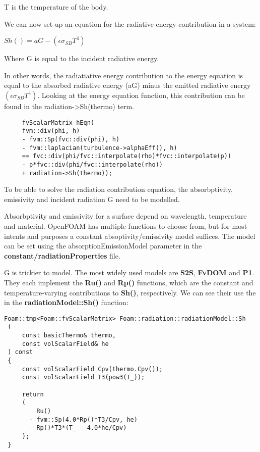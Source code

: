 T is the temperature of the body.

We can now set up an equation for the radiative energy contribution in a system:

$Sh()=aG-(\epsilon \sigma_{SB}T^4)$

Where G is equal to the incident radiative energy.

In other words, the radiatiative energy contribution to the energy equation is equal to the absorbed radiative energy (aG) minus the emitted radiative energy $(\epsilon \sigma_{SB}T^4)$. Looking at the energy equation function, this contribution can be found in the radiation->Sh(thermo) term.

\begin{verbatim}
     fvScalarMatrix hEqn(    
     fvm::div(phi, h)       
     - fvm::Sp(fvc::div(phi), h)
     - fvm::laplacian(turbulence->alphaEff(), h)      
     == fvc::div(phi/fvc::interpolate(rho)*fvc::interpolate(p))
     - p*fvc::div(phi/fvc::interpolate(rho))
     + radiation->Sh(thermo));
\end{verbatim}

To be able to solve the radiation contribution equation, the absorbptivity, emissivity and incident radiation G need to be modelled.

Absorbptivity and emissivity for a surface depend on wavelength, temperature and material. OpenFOAM has multiple functions to choose from, but for most intents and purposes a constant absoptivity/emissivity model suffices. The model can be set using the absorptionEmissionModel parameter in the \textbf{constant/radiationProperties} file.

G is trickier to model. The most widely used models are \textbf{S2S}, \textbf{FvDOM} and \textbf{P1}. They each implement the \textbf{Ru()} and \textbf{Rp()} functions, which are the constant and temperature-varying contributions to \textbf{Sh()}, respectively. We can see their use the in the \textbf{radiationModel::Sh()} function:

\begin{verbatim}
Foam::tmp<Foam::fvScalarMatrix> Foam::radiation::radiationModel::Sh
 (
     const basicThermo& thermo,
     const volScalarField& he
 ) const
 {
     const volScalarField Cpv(thermo.Cpv());
     const volScalarField T3(pow3(T_));
  
     return
     (
         Ru()
       - fvm::Sp(4.0*Rp()*T3/Cpv, he)
       - Rp()*T3*(T_ - 4.0*he/Cpv)
     );
 }
\end{verbatim}

